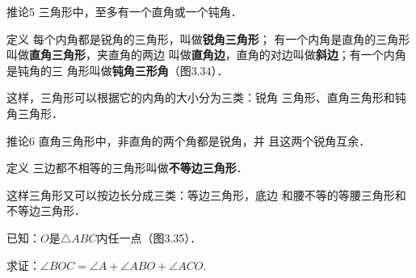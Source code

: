\begin{blk}
    {推论5 }三角形中，至多有一个直角或一个钝角．
\end{blk}

\begin{blk}
   {定义} 每个内角都是锐角的三角形，叫做\textbf{锐角三角形}；
有一个内角是直角的三角形叫做\textbf{直角三角形}，夹直角的两边
叫做\textbf{直角边}，直角的对边叫做\textbf{斜边}；有一个内角是钝角的三
角形叫做\textbf{钝角三形角}（图3.34）．
\end{blk}

\begin{figure}[htp]
    \centering
{}
    \caption{}
\end{figure}

这样，三角形可以根据它的内角的大小分为三类：锐角
三角形、直角三角形和钝角三角形．

\begin{blk}
{推论6} 直角三角形中，非直角的两个角都是锐角，并
且这两个锐角互余．
\end{blk}

\begin{blk}
{定义}
三边都不相等的三角形叫做\textbf{不等边三角形}．
\end{blk}

这样三角形又可以按边长分成三类：等边三角形，底边
和腰不等的等腰三角形和不等边三角形．


\begin{example}
    已知：$O$是$\triangle ABC$内任一点（图3.35）．

求证：$\angle BOC=\angle A+\angle ABO+\angle ACO$.
\end{example}

